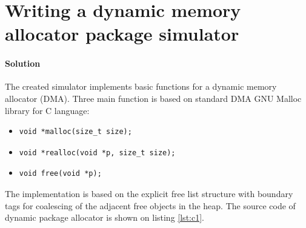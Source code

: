 \documentclass{article}
\newcommand\mylstcaption{}
\begin{document}
\section{Writing a dynamic memory allocator package simulator}
\paragraph{Solution}
The created simulator implements basic functions for a dynamic memory allocator (DMA).
Three main function is based on standard DMA GNU Malloc library for C language:
\begin{itemize}
    \item \begin{verbatim}void *malloc(size_t size);\end{verbatim}
    \item \begin{verbatim}void *realloc(void *p, size_t size);\end{verbatim}
    \item \begin{verbatim}void free(void *p);\end{verbatim}
\end{itemize}
The implementation is based on the explicit free list structure
with boundary tags for coalescing of the adjacent free objects in the heap.
The source code of dynamic package allocator is shown on listing \ref{lst:c1}.
\renewcommand\mylstcaption{.}
\begin{mdlisting}
    
\end{mdlisting}
\end{document}
